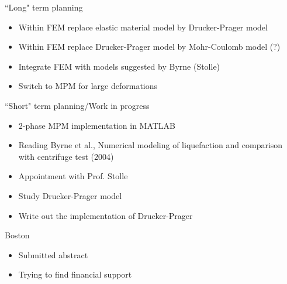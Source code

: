 \documentclass[mathserif,professionalfont,hyperref={pdfpagelabels=false}]{beamer}
\begin{document}
\begin{frame}{``Long" term planning}
\begin{itemize}
\item Within FEM replace elastic material model by Drucker-Prager model
\pause
\item Within FEM replace Drucker-Prager model by Mohr-Coulomb model (?)
\pause
\item Integrate FEM with models suggested by Byrne (Stolle)
\pause
\item Switch to MPM for large deformations
\end{itemize}
\end{frame}


\begin{frame}{``Short" term planning/Work in progress}
\begin{itemize}
\item 2-phase MPM implementation in MATLAB
\item Reading Byrne et al., Numerical modeling of liquefaction and comparison with centrifuge test (2004)
\pause
\item Appointment with Prof. Stolle
\item Study Drucker-Prager model
\item Write out the implementation of Drucker-Prager 
\end{itemize}
\end{frame}

\begin{frame}{Boston}
\begin{itemize}
\item Submitted abstract
\item Trying to find financial support
\end{itemize}
\end{frame}

\end{document}
